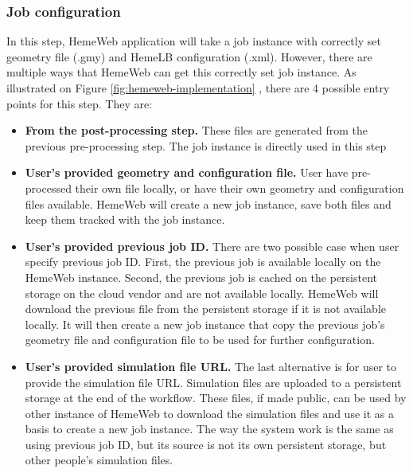 \subsubsection{Job configuration}

In this step, HemeWeb application will take a job instance with correctly set geometry file (.gmy) and HemeLB configuration (.xml). However, there are multiple ways that HemeWeb can get this correctly set job instance. As illustrated on Figure \ref{fig:hemeweb-implementation} , there are 4 possible entry points for this step. They are:

\begin{itemize}
    \item \textbf{From the post-processing step.}
    	These files are generated from the previous pre-processing step. The job instance is directly used in this step
    
    \item \textbf{User's provided geometry and configuration file.}
    	User have pre-processed their own file locally, or have their own geometry and configuration files available. HemeWeb will create a new job instance, save both files and keep them tracked with the job instance.
	
    \item \textbf{User's provided previous job ID.}
    	There are two possible case when user specify previous job ID. First, the previous job is available locally on the HemeWeb instance. Second, the previous job is cached on the persistent storage on the cloud vendor and are not available locally. HemeWeb will download the previous file from the persistent storage if it is not available locally. It will then create a new job instance that copy the previous job's geometry file and configuration file to be used for further configuration.
    
    \item \textbf{User's provided simulation file URL.}
    	The last alternative is for user to provide the simulation file URL. Simulation files are uploaded to a persistent storage at the end of the workflow. These files, if made public, can be used by other instance of HemeWeb to download the simulation files and use it as a basis to create a new job instance. The way the system work is the same as using previous job ID, but its source is not its own persistent storage, but other people's simulation files.

\end{itemize}


